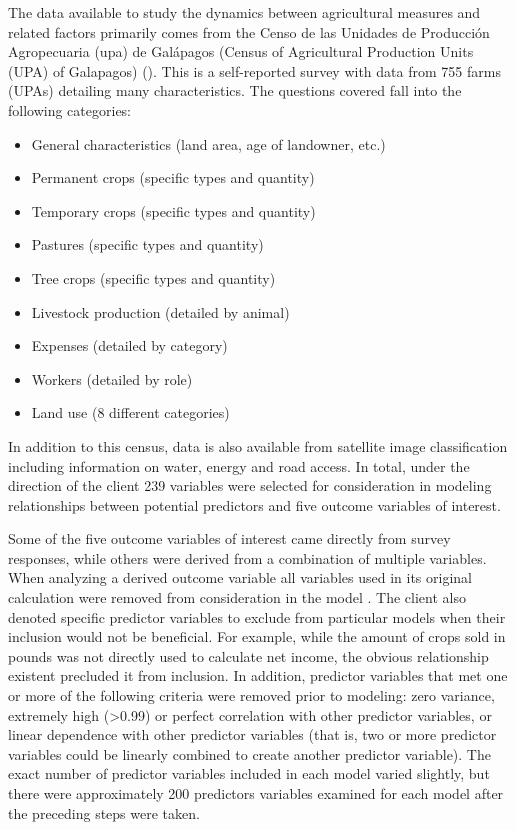\documentclass{article}
\begin{document}
The data available to study the dynamics between agricultural measures and related factors primarily 
comes from the Censo de las Unidades de Producci\'on Agropecuaria (upa) de Gal\'apagos (Census of Agricultural Production 
Units (UPA) of Galapagos) (\cite{census}). This is a self-reported survey with data from 755 farms (UPAs) detailing many characteristics. The questions covered fall into the following categories:
\begin{itemize}
\item{General characteristics (land area, age of landowner, etc.)}
\item{Permanent crops (specific types and quantity)}
\item{Temporary crops (specific types and quantity)}
\item{Pastures (specific types and quantity)}
\item{Tree crops (specific types and quantity)}
\item{Livestock production (detailed by animal)}
\item{Expenses (detailed by category)}
\item{Workers (detailed by role)}
\item{Land use (8 different categories)}

\end{itemize}

In addition to this census, data is also available from satellite image classification including 
information on water, energy and road access. In total, under the direction of the client 239 variables were selected for 
consideration in modeling relationships between potential predictors and five outcome variables of interest. 

Some of the five outcome variables of interest came directly from survey responses, while others were derived from a 
combination of multiple variables. When analyzing a derived outcome variable all variables used in its original calculation were 
removed from consideration in the model . The client also denoted specific predictor variables to exclude from particular 
models when their inclusion would not be beneficial. For example, while the 
amount of crops sold in pounds was not directly used to calculate net income, the obvious relationship existent precluded it 
from inclusion. In addition, predictor variables that met one or more of the following criteria were removed prior to modeling: 
zero variance, extremely high (>0.99) or perfect correlation with other predictor variables, or linear dependence with other 
predictor variables (that is, two or more predictor variables could be linearly combined to create another predictor variable). The 
exact number of predictor variables included in each model varied slightly, but there were approximately 200 predictors variables examined for each model after the preceding steps were taken.
\end{document}
